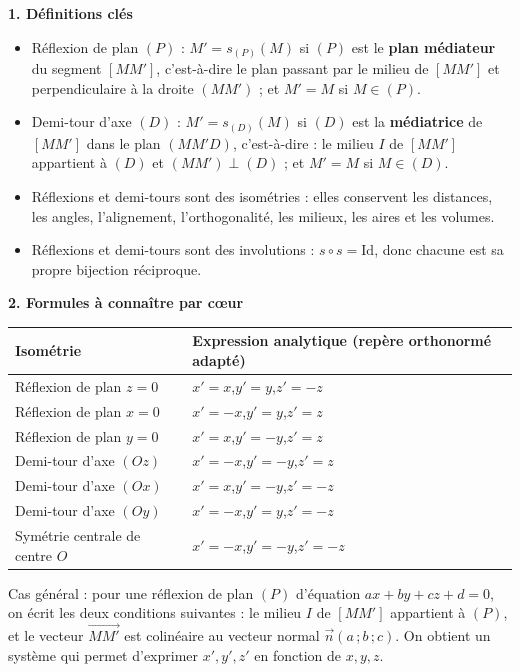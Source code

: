 \documentclass[11pt]{article}
\newcommand{\cle}[1]{{\popxbold\color{popdark}#1}}
\begin{document}
\begin{aretenir}
\textbf{1. Définitions clés}
\begin{itemize}
  \item \cle{Réflexion} de plan $(P)$ : $M' = s_{(P)}(M)$ si $(P)$ est le \textbf{plan médiateur} du segment $[MM']$, c'est-à-dire le plan passant par le milieu de $[MM']$ et perpendiculaire à la droite $(MM')$ ; et $M'=M$ si $M\in(P)$.
  \item \cle{Demi-tour} d'axe $(D)$ : $M' = s_{(D)}(M)$ si $(D)$ est la \textbf{médiatrice} de $[MM']$ dans le plan $(MM'D)$, c'est-à-dire : le milieu $I$ de $[MM']$ appartient à $(D)$ et $(MM')\perp(D)$ ; et $M'=M$ si $M\in(D)$.
  \item Réflexions et demi-tours sont des \cle{isométries} : elles conservent les distances, les angles, l'alignement, l'orthogonalité, les milieux, les aires et les volumes.
  \item Réflexions et demi-tours sont des \cle{involutions} : $s\circ s = \mathrm{Id}$, donc chacune est sa propre bijection réciproque.
\end{itemize}

\textbf{2. Formules à connaître par c\oe ur}

\begin{center}
\begin{tabularx}{\linewidth}{|l|X|}
\hline
\rowcolor{popblueL} \textbf{Isométrie} & \textbf{Expression analytique (repère orthonormé adapté)} \\
\hline
Réflexion de plan $z=0$ & $x'=x$,\quad $y'=y$,\quad $z'=-z$ \\
\hline
Réflexion de plan $x=0$ & $x'=-x$,\quad $y'=y$,\quad $z'=z$ \\
\hline
Réflexion de plan $y=0$ & $x'=x$,\quad $y'=-y$,\quad $z'=z$ \\
\hline
Demi-tour d'axe $(Oz)$ & $x'=-x$,\quad $y'=-y$,\quad $z'=z$ \\
\hline
Demi-tour d'axe $(Ox)$ & $x'=x$,\quad $y'=-y$,\quad $z'=-z$ \\
\hline
Demi-tour d'axe $(Oy)$ & $x'=-x$,\quad $y'=y$,\quad $z'=-z$ \\
\hline
Symétrie centrale de centre $O$ & $x'=-x$,\quad $y'=-y$,\quad $z'=-z$ \\
\hline
\end{tabularx}
\end{center}

Cas général : pour une réflexion de plan $(P)$ d'équation $ax+by+cz+d=0$, on écrit les deux conditions suivantes : le milieu $I$ de $[MM']$ appartient à $(P)$, et le vecteur $\overrightarrow{MM'}$ est colinéaire au vecteur normal $\vec{n}(a\,;b\,;c)$. On obtient un système qui permet d'exprimer $x',y',z'$ en fonction de $x,y,z$.


\end{aretenir}
\end{document}

